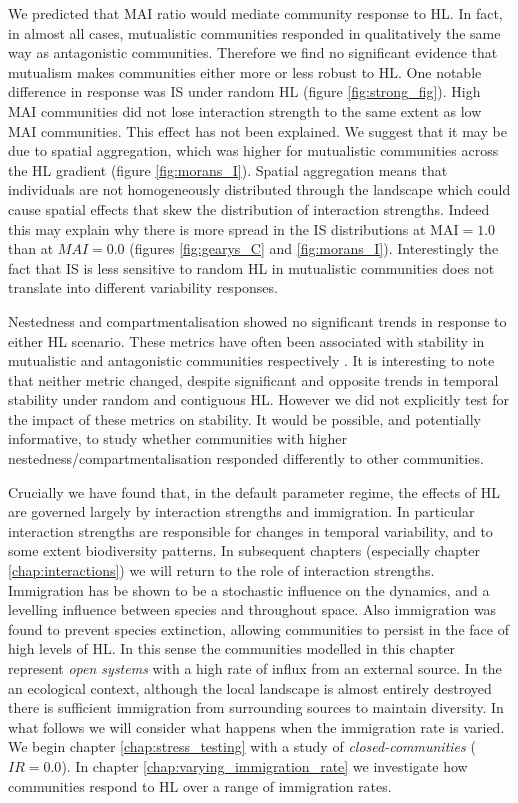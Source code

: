 We predicted that MAI ratio would mediate community response to HL. In fact, in almost all cases, mutualistic communities responded in qualitatively the same way as antagonistic communities. Therefore we find no significant evidence that mutualism makes communities either more or less robust to HL. One notable difference in response was IS under random HL (figure \ref{fig:strong_fig}). High MAI communities did not lose interaction strength to the same extent as low MAI communities. This effect has not been explained. We suggest that it may be due to spatial aggregation, which was higher for mutualistic communities across the HL gradient (figure \ref{fig:morans_I}). Spatial aggregation means that individuals are not homogeneously distributed through the landscape which could cause spatial effects that skew the distribution of interaction strengths. Indeed this may explain why there is more spread in the IS distributions at MAI$=1.0$ than at $MAI=0.0$ (figures \ref{fig:gearys_C} and \ref{fig:morans_I}). Interestingly the fact that IS is less sensitive to random HL in mutualistic communities does not translate into different variability responses.

Nestedness and compartmentalisation showed no significant trends in response to either HL scenario. These metrics have often been associated with stability in mutualistic and antagonistic communities respectively \cite{thebault2010stability}. It is interesting to note that neither metric changed, despite significant and opposite trends in temporal stability under random and contiguous HL. However we did not explicitly test for the impact of these metrics on stability. It would be possible, and potentially informative, to study whether communities with higher nestedness/compartmentalisation responded differently to other communities.   

Crucially we have found that, in the default parameter regime, the effects of HL are governed largely by interaction strengths and immigration. In particular interaction strengths are responsible for changes in temporal variability, and to some extent biodiversity patterns. In subsequent chapters (especially chapter \ref{chap:interactions}) we will return to the role of interaction strengths. Immigration has be shown to be a stochastic influence on the dynamics, and a levelling influence between species and throughout space. Also immigration was found to prevent species extinction, allowing communities to persist in the face of high levels of HL. In this sense the communities modelled in this chapter represent \emph{open systems} with a high rate of influx from an external source. In the an ecological context, although the local landscape is almost entirely destroyed there is sufficient immigration from surrounding sources to maintain diversity. In what follows we will consider what happens when the immigration rate is varied. We begin chapter \ref{chap:stress_testing} with a study of \emph{closed-communities} ($IR=0.0$). In chapter \ref{chap:varying_immigration_rate} we investigate how communities respond to HL over a range of immigration rates. 
   

